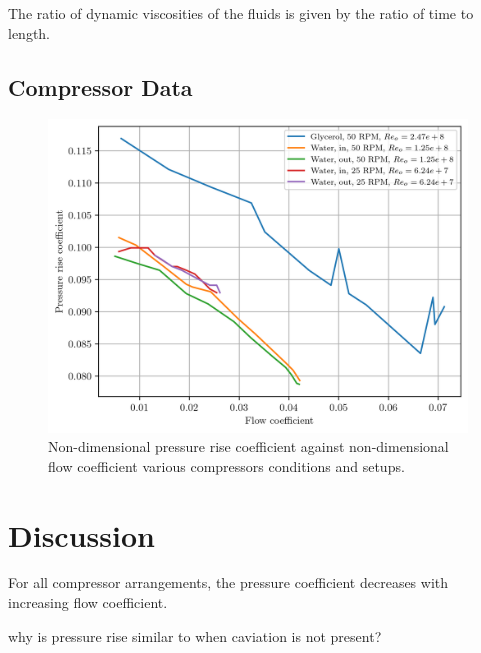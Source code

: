 \documentclass{article}
\begin{document}
The ratio of dynamic viscosities of the fluids is given by the ratio of time to length.

\subsection{Compressor Data}

\begin{figure}[H]
    \centering
    \includegraphics[width=0.99\textwidth]{compressor_non_dims.png}
    \caption{Non-dimensional pressure rise coefficient against non-dimensional flow coefficient various compressors conditions and setups.}
    \label{fig:compressor_non_dims}
\end{figure}

\section{Discussion}

For all compressor arrangements, the pressure coefficient decreases with increasing flow coefficient.



why is pressure rise similar to when caviation is not present?

\end{document}
